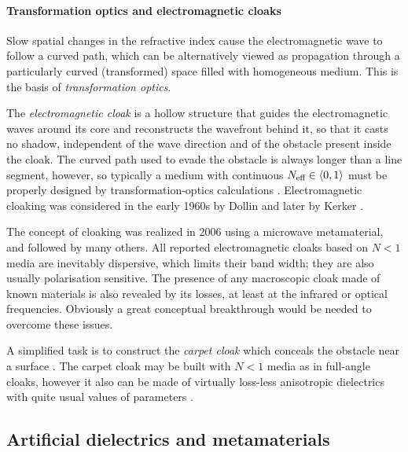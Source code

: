 \paragraph{Transformation optics and electromagnetic cloaks} %
Slow spatial changes in the refractive index cause the electromagnetic wave to follow a curved path, which can be alternatively viewed as propagation through a particularly curved (transformed) space filled with homogeneous medium. This is the basis of \textit{transformation optics}.

The \textit{electromagnetic cloak} is a hollow structure that guides the electromagnetic waves around its core and reconstructs the wavefront behind it, so that it casts no shadow, independent of the wave direction and of the obstacle present inside the cloak. 
The curved path used to evade the obstacle is always longer than a line segment, however, so typically a medium with continuous $N_{\text{eff} }\in \langle0,1\rangle$ must be properly designed by transformation-optics calculations \cite{eleftheriades2012transforming}.
Electromagnetic cloaking %
was considered in the early 1960s by Dollin \cite{dollin1961possibility} and later by Kerker \cite{kerker1975invisible}.

The concept of cloaking was realized \cite{schurig2006metamaterial} in 2006 using a microwave metamaterial, and followed by many others.
All reported electromagnetic cloaks based on $N<1$ media are inevitably dispersive, which limits their band width; they are also usually polarisation sensitive. The presence of any macroscopic cloak made of known materials is also revealed by its losses, at least at the infrared or optical frequencies. Obviously a great conceptual breakthrough would be needed to overcome these issues. 

A simplified task is to construct the \textit{carpet cloak} which conceals the obstacle near a surface \cite{valentine2009optical}.
The carpet cloak may be built with $N<1$ media as in full-angle cloaks, however it also can be made of virtually loss-less anisotropic dielectrics with quite usual values of parameters \cite{wang2013homogeneous}.


\subsection{Artificial dielectrics and metamaterials} 
